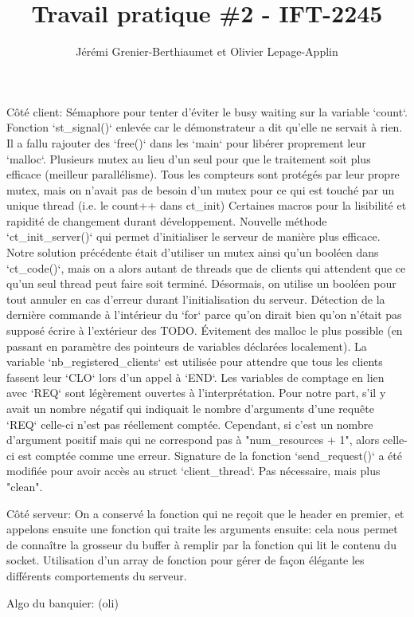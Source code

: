 \documentclass[11pt]{article}
\title{Travail pratique \#2 - IFT-2245}
\author{Jérémi Grenier-Berthiaumet et Olivier Lepage-Applin}
\begin{document}
\maketitle


Côté client:
Sémaphore pour tenter d'éviter le busy waiting sur la variable `count`.
Fonction `st\_signal()` enlevée car le démonstrateur a dit qu'elle ne servait à rien.
Il a fallu rajouter des `free()` dans les `main` pour libérer proprement leur `malloc`.
Plusieurs mutex au lieu d'un seul pour que le traitement soit plus efficace (meilleur parallélisme). Tous les compteurs sont protégés par leur propre mutex, mais on n'avait pas de besoin d'un mutex pour ce qui est touché par un unique thread (i.e. le count++ dans ct\_init)
Certaines macros pour la lisibilité et rapidité de changement durant développement.
Nouvelle méthode `ct\_init\_server()` qui permet d'initialiser le serveur de manière plus efficace. Notre solution précédente était d'utiliser un mutex ainsi qu'un booléen dans `ct\_code()`, mais on a alors autant de threads que de clients qui attendent que ce qu'un seul thread peut faire soit terminé. Désormais, on utilise un booléen pour tout annuler en cas d'erreur durant l'initialisation du serveur.
Détection de la dernière commande à l'intérieur du `for` parce qu'on dirait bien qu'on n'était pas supposé écrire à l'extérieur des TODO.
Évitement des malloc le plus possible (en passant en paramètre des pointeurs de variables déclarées localement).
La variable `nb\_registered\_clients` est utilisée pour attendre que tous les clients fassent leur `CLO` lors d'un appel à `END`.
Les variables de comptage en lien avec `REQ` sont légèrement ouvertes à l'interprétation. Pour notre part, s'il y avait un nombre négatif qui indiquait le nombre d'arguments d'une requête `REQ` celle-ci n'est pas réellement comptée. Cependant, si c'est un nombre d'argument positif mais qui ne correspond pas à "num\_resources + 1", alors celle-ci est comptée comme une erreur.
Signature de la fonction `send\_request()` a été modifiée pour avoir accès au struct `client\_thread`. Pas nécessaire, mais plus "clean".


Côté serveur:
On a conservé la fonction qui ne reçoit que le header en premier, et appelons ensuite une fonction qui traite les arguments ensuite: cela nous permet de connaître la grosseur du buffer à remplir par la fonction qui lit le contenu du socket.
Utilisation d'un array de fonction pour gérer de façon élégante les différents comportements du serveur.



Algo du banquier:
(oli)
\end{document}
